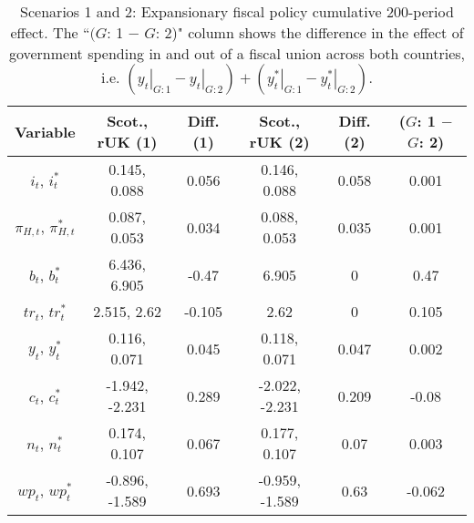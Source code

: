\begin{table}[H]
\centering
\begin{tabular}{cccccc}
  \hline
{\textbf{Variable}} & {\textbf{Scot., rUK (1)}} & {\textbf{Diff. (1)}} & {\textbf{Scot., rUK (2)}} & {\textbf{Diff. (2)}} & {\textbf{($G$: 1 $-$ $G$: 2)}} \\ 
  \hline
${i_t}$, ${i^*_t}$ & 0.145, 0.088 & 0.056 & 0.146, 0.088 & 0.058 & 0.001 \\ 
  ${\pi_{H,t}}$, ${\pi^*_{H,t}}$ & 0.087, 0.053 & 0.034 & 0.088, 0.053 & 0.035 & 0.001 \\ 
  ${b_t}$, ${b^*_t}$ & 6.436, 6.905 & -0.47 & 6.905 & 0 & 0.47 \\ 
  ${tr_t}$, ${tr^*_t}$ & 2.515, 2.62 & -0.105 & 2.62 & 0 & 0.105 \\ 
  ${y_t}$, ${y^*_t}$ & 0.116, 0.071 & 0.045 & 0.118, 0.071 & 0.047 & 0.002 \\ 
  ${c_t}$, ${c^*_t}$ & -1.942, -2.231 & 0.289 & -2.022, -2.231 & 0.209 & -0.08 \\ 
  ${n_t}$, ${n^*_t}$ & 0.174, 0.107 & 0.067 & 0.177, 0.107 & 0.07 & 0.003 \\ 
  ${wp_t}$, ${wp^*_t}$ & -0.896, -1.589 & 0.693 & -0.959, -1.589 & 0.63 & -0.062 \\ 
   \hline
\end{tabular}
\caption{Scenarios 1 and 2: Expansionary fiscal policy cumulative 200-period effect. The ``$(G$: 1 $-$ $G$: 2)" column shows the difference in the effect of government spending in and out of a fiscal union across both countries, i.e. $(\left. y_t \right|_{G:1} - \left. y_t \right|_{G:2}) + (\left. y^*_t \right|_{G:1} - \left. y^*_t \right|_{G:2})$.} 
\label{table:responses_one_two}
\end{table}
